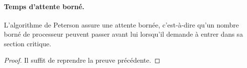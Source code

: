 \paragraph{Temps d'attente borné.}

\begin{proposition}
L'algorithme de Peterson assure une attente bornée, c'est-à-dire qu'un nombre borné de processeur peuvent passer avant lui lorsqu'il demande à entrer dans sa section critique.
\end{proposition}

\begin{proof}
Il suffit de reprendre la preuve précédente.
\end{proof}

